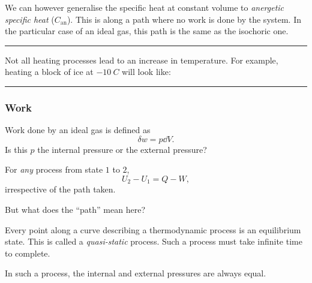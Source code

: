 We can however generalise the specific heat at constant volume to
\emph{anergetic specific heat} ($C_{\textrm{an}}$).
This is along a path where no work is done by the system.
In the particular case of an ideal gas, this path is the same as the isochoric
one. \\
\hrule
Not all heating processes lead to an increase in temperature.
For example, heating a block of ice at $\SI{-10}{C}$ will look
like:
\begin{center}
\end{center}
\hrule

\subsubsection{Work} \label{sec:work}
Work done by an ideal gas is defined as \[
    \delta w = p \dd V.
\] Is this $p$ the internal pressure or the external pressure?

For \emph{any} process from state $1$ to $2$, \[
    U_{2} - U_{1} = Q - W,
\] irrespective of the path taken.

But what does the ``path'' mean here?
\begin{center}
\end{center}
Every point along a curve describing a thermodynamic process is an equilibrium
state.
This is called a \emph{quasi-static} process.
Such a process must take infinite time to complete.

In such a process, the internal and external pressures are always equal.
